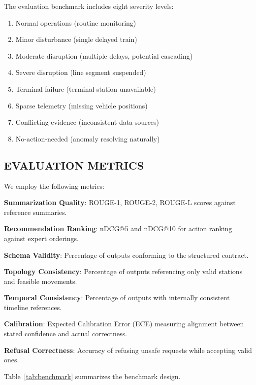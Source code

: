 \documentclass{IEEEoj}
\begin{document}
The evaluation benchmark includes eight severity levels:
\begin{enumerate}
    \item Normal operations (routine monitoring)
    \item Minor disturbance (single delayed train)
    \item Moderate disruption (multiple delays, potential cascading)
    \item Severe disruption (line segment suspended)
    \item Terminal failure (terminal station unavailable)
    \item Sparse telemetry (missing vehicle positions)
    \item Conflicting evidence (inconsistent data sources)
    \item No-action-needed (anomaly resolving naturally)
\end{enumerate}

\subsection{EVALUATION METRICS}

We employ the following metrics:

\textbf{Summarization Quality}: ROUGE-1, ROUGE-2, ROUGE-L scores against reference summaries.

\textbf{Recommendation Ranking}: nDCG@5 and nDCG@10 for action ranking against expert orderings.

\textbf{Schema Validity}: Percentage of outputs conforming to the structured contract.

\textbf{Topology Consistency}: Percentage of outputs referencing only valid stations and feasible movements.

\textbf{Temporal Consistency}: Percentage of outputs with internally consistent timeline references.

\textbf{Calibration}: Expected Calibration Error (ECE) measuring alignment between stated confidence and actual correctness.

\textbf{Refusal Correctness}: Accuracy of refusing unsafe requests while accepting valid ones.

Table~\ref{tab:benchmark} summarizes the benchmark design.
\end{document}
